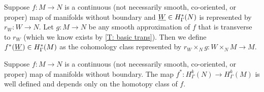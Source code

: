 \begin{definition}
Suppose $f \colon M \to N$ is a continuous (not necessarily smooth, co-oriented, or proper) map of manifolds without boundary and $\underline{W} \in H^*_\Gamma(N)$ is represented by $r_W \colon W \to N$. Let $g \colon M \to N$ be any smooth approximation of $f$ that is transverse to $r_W$ (which we know exists by \cref{T: basic trans}). Then we define $f^*(\underline{W}) \in H^*_\Gamma(M)$ as the cohomology class represented by $r_W\times_N g \colon W\times_N M \to M$.
\end{definition}


\begin{proposition}\label{P: cohomology pullback}
Suppose $f \colon M \to N$ is a continuous (not necessarily smooth, co-oriented, or proper) map of manifolds without boundary. The map $f^*:H^k_\Gamma(N) \to H^k_\Gamma(M)$ is well defined and depends only on the homotopy class of $f$.
\end{proposition}
